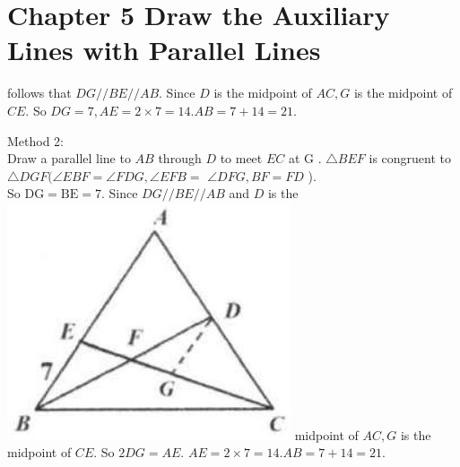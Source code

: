 \documentclass[10pt]{article}
\begin{document}
\section*{Chapter 5 Draw the Auxiliary Lines with Parallel Lines}
follows that \(D G / / B E / / A B\). Since \(D\) is the midpoint of \(A C, G\) is the midpoint of \(C E\). So \(D G=7, A E=2 \times 7=14 . A B=7+14=21\).

Method 2:\\
Draw a parallel line to \(A B\) through \(D\) to meet \(E C\) at G . \(\triangle B E F\) is congruent to \(\triangle D G F(\angle E B F=\angle F D G, \angle E F B=\) \(\angle D F G, B F=F D\) ).\\
So \(\mathrm{DG}=\mathrm{BE}=7\). Since \(D G / / B E / / A B\) and \(D\) is the\\
\includegraphics[max width=\textwidth]{2025_04_17_97bc1f7e44d93c271a88g-133} midpoint of \(A C, G\) is the midpoint of \(C E\). So \(2 D G=A E\). \(A E=2 \times 7=14 . A B=7+14=21\).
\end{document}
